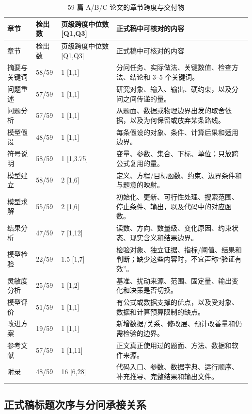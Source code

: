 \documentclass[UTF8,zihao=-4]{ctexart}
\begin{document}
\begin{longtable}{p{2.3cm}p{1.5cm}p{3.0cm}p{8.0cm}}
\caption{59 篇 A/B/C 论文的章节跨度与交付物}\label{tab:template-corpus-length}\\
\toprule
章节 & 检出数 & 页级跨度中位数 [Q1,Q3] & 正式稿中可核对的内容\\
\midrule
\endfirsthead
\toprule
章节 & 检出数 & 页级跨度中位数 [Q1,Q3] & 正式稿中可核对的内容\\
\midrule
\endhead
摘要与关键词 & 58/59 & 1 [1,1] & 分问任务、实际做法、关键数值、检查方法、结论和 3--5 个关键词。\\
问题重述 & 57/59 & 1 [1,1] & 研究对象、输入、输出、硬约束，以及分问之间传递的量。\\
问题分析 & 57/59 & 1 [1,1] & 从题面、数据或物理边界出发的取舍依据，以及为何保留或放弃某条路线。\\
模型假设 & 48/59 & 1 [1,1] & 每条假设的对象、条件、计算后果和适用边界。\\
符号说明 & 58/59 & 1 [1,3.75] & 变量、参数、集合、下标、单位；只放跨公式复用的量。\\
模型建立 & 58/59 & 2 [1,6] & 定义、方程/目标函数、约束、边界条件和与题意的映射。\\
模型求解 & 55/59 & 2 [1,6] & 初始化、更新、可行性处理、搜索范围、停止条件、输出，以及代码中的对应函数。\\
结果分析 & 47/59 & 7 [1,12] & 读数、方向、数量级、变化原因、约束状态、现实含义和结果边界。\\
模型检验 & 22/59 & 1.5 [1,7] & 检验对象、独立证据、指标/阈值、结果和判断；缺少这些内容时，不宜声称“验证有效”。\\
灵敏度分析 & 25/59 & 1 [1,2] & 基准、扰动来源、范围、固定量、输出变化和决策是否切换。\\
模型评价 & 51/59 & 1 [1,1] & 有公式或数据支撑的优点，以及受对象、数据和计算预算限制的缺点。\\
改进方案 & 19/59 & 1 [1,1] & 新增数据/关系、修改层、预计改善量和仍需检验的边界。\\
参考文献 & 57/59 & 1 [1,11] & 正文真正使用过的题面、方法、数据和软件来源。\\
附录 & 48/59 & 16 [6,28] & 代码入口、参数、数据字典、运行顺序、补充推导、完整结果和输出文件。\\
\bottomrule
\end{longtable}

\subsection{正式稿标题次序与分问承接关系}
\end{document}
